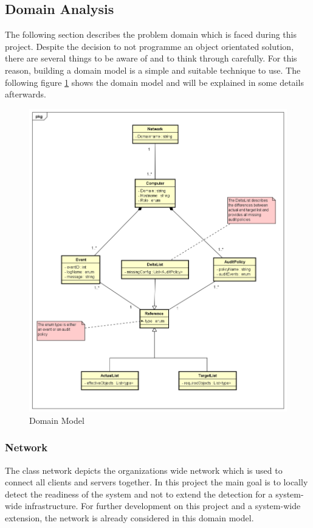\clearpage

\subsection{Domain Analysis}
The following section describes the problem domain which is faced during this project. Despite the decision to not programme an object orientated solution, there are several things to be aware of and to think through carefully. For this reason, building a domain model is a simple and suitable technique to use. The following figure \ref{fig:domainmodel} shows the domain model and will be explained in some details afterwards. 
\begin{figure}[H]
    \centering
    \includegraphics[width=0.95\linewidth]{assets/architecture/DomainModelSRI.png}
    \caption{Domain Model}\label{fig:domainmodel}
\end{figure}

\subsubsection{Network}
The class network depicts the organizations wide network which is used to connect all clients and servers together. In this project the main goal is to locally detect the readiness of the system and not to extend the detection for a system-wide infrastructure. For further development on this project and a system-wide extension, the network is already considered in this domain model.


